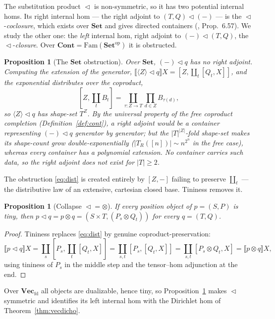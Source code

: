 \documentclass[11pt]{amsart}
\theoremstyle{plain}
\newtheorem{proposition}[theorem]{Proposition}
\theoremstyle{definition}
\theoremstyle{remark}
\newcommand{\Set}{\mathbf{Set}}
\newcommand{\Vecfd}{\mathbf{Vec}_{\mathrm{fd}}}
\newcommand{\Fam}{\mathrm{Fam}}
\newcommand{\Cont}{\mathbf{Cont}}
\newcommand{\ext}[1]{\llbracket #1 \rrbracket}
\newcommand{\ihom}[2]{[#1,#2]}
\renewcommand{\lhd}{\vartriangleleft}
\newcommand{\op}{\mathrm{op}}
\newcommand{\coprodd}{\textstyle\coprod}
\newcommand{\prodd}{\textstyle\prod}
\begin{document}
The substitution product $\lhd$ is non-symmetric, so it has two potential internal homs. Its right
internal hom --- the right adjoint to $(T,Q)\lhd(-)$ --- is the $\lhd$-\emph{coclosure}, which
exists over $\Set$ and gives directed containers (\cite{NiuSpivak}, Prop.~6.57). We study the other
one: the \emph{left} internal hom, right adjoint to $(-)\lhd(T,Q)$, the $\lhd$-\emph{closure}. Over
$\Cont=\Fam(\Set^\op)$ it is obstructed.

\begin{proposition}[The $\Set$ obstruction]\label{prop:setobstr}
Over $\Set$, $(-)\lhd q$ has no right adjoint. Computing the extension of the generator,
$\ext{\langle Z\rangle\lhd q}X=\ihom{Z}{\coprodd_t\ihom{Q_t}{X}}$, and the exponential distributes
over the coproduct,
\begin{equation}\label{eq:dist}
\ihom{Z}{\coprodd_t B_t}=\coprodd_{\tau\colon Z\to T}\prodd_{d\in Z}B_{\tau(d)},
\end{equation}
so $\langle Z\rangle\lhd q$ has shape-set $T^Z$. By the universal property of the free coproduct
completion (Definition~\ref{def:cont}), a right adjoint would be a container representing
$(-)\lhd q$ generator by generator; but the $|T|^{|Z|}$-fold shape-set makes its shape-count grow
double-exponentially ($|T_R([n])|\sim n^{2^n}$ in the free case), whereas every container has a
\emph{polynomial} extension. No container carries such data, so the right adjoint does not exist for
$|T|\ge 2$.
\end{proposition}

The obstruction \eqref{eq:dist} is created entirely by $\ihom{Z}{-}$ failing to preserve
$\coprodd_t$ --- the distributive law of an extensive, cartesian closed base. Tininess removes it.

\begin{proposition}[Collapse $\lhd=\otimes$]\label{prop:collapse}
If every position object of $p=(S,P)$ is tiny, then $p\lhd q=p\otimes q=(S\times T,(P_s\otimes Q_t))$
for every $q=(T,Q)$.
\end{proposition}
\begin{proof}
Tininess replaces \eqref{eq:dist} by genuine coproduct-preservation:
\[
\ext{p\lhd q}X=\coprodd_s\ihom{P_s}{\coprodd_t\ihom{Q_t}{X}}
=\coprodd_{s,t}\ihom{P_s}{\ihom{Q_t}{X}}
=\coprodd_{s,t}\ihom{P_s\otimes Q_t}{X}
=\ext{p\otimes q}X,
\]
using tininess of $P_s$ in the middle step and the tensor--hom adjunction at the end.
\end{proof}

Over $\Vecfd$ all objects are dualizable, hence tiny, so Proposition~\ref{prop:collapse} makes $\lhd$
symmetric and identifies its left internal hom with the Dirichlet hom of
Theorem~\ref{thm:vecdicho}.
\end{document}

